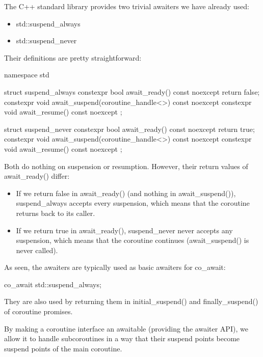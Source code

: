 The C++ standard library provides two trivial awaiters we have already used:

\begin{itemize}
\item 
std::suspend\_always

\item 
std::suspend\_never
\end{itemize}

Their definitions are pretty straightforward:

\begin{cpp}
namespace std {
	struct suspend_always {
		constexpr bool await_ready() const noexcept { return false; }
		constexpr void await_suspend(coroutine_handle<>) const noexcept { }
		constexpr void await_resume() const noexcept { }
	};
	
	struct suspend_never {
		constexpr bool await_ready() const noexcept { return true; }
		constexpr void await_suspend(coroutine_handle<>) const noexcept { }
		constexpr void await_resume() const noexcept { }
	};
}
\end{cpp}

Both do nothing on suspension or resumption. However, their return values of await\_ready() differ:

\begin{itemize}
\item 
If we return false in await\_ready() (and nothing in await\_suspend()), suspend\_always accepts every suspension, which means that the coroutine returns back to its caller.

\item 
If we return true in await\_ready(), suspend\_never never accepts any suspension, which means that the coroutine continues (await\_suspend() is never called).
\end{itemize}

As seen, the awaiters are typically used as basic awaiters for co\_await:

\begin{cpp}
co_await std::suspend_always{};
\end{cpp}

They are also used by returning them in initial\_suspend() and finally\_suspend() of coroutine promises.


By making a coroutine interface an awaitable (providing the awaiter API), we allow it to handle subcoroutines in a way that their suspend points become suspend points of the main coroutine.

